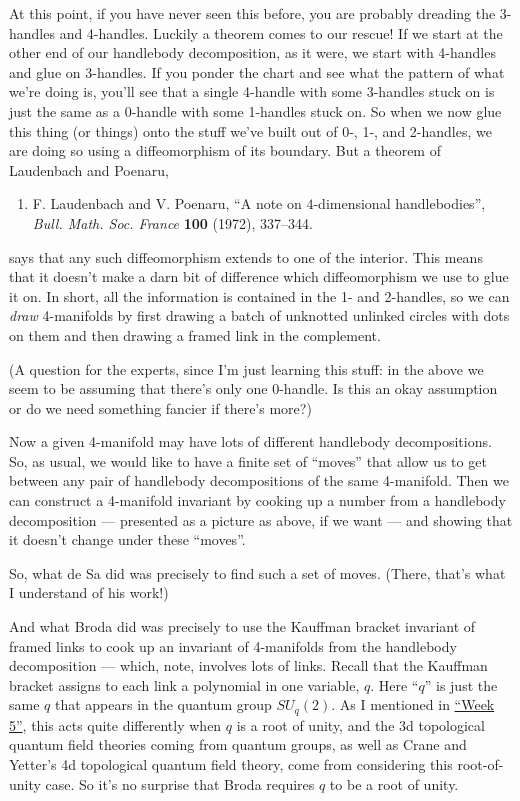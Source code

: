 \documentclass{article}
\begin{document}
At this point, if you have never seen this before, you are probably
dreading the 3-handles and 4-handles. Luckily a theorem comes to our
rescue! If we start at the other end of our handlebody decomposition, as
it were, we start with 4-handles and glue on 3-handles. If you ponder
the chart and see what the pattern of what we're doing is, you'll see
that a single 4-handle with some 3-handles stuck on is just the same as
a 0-handle with some 1-handles stuck on. So when we now glue this thing
(or things) onto the stuff we've built out of 0-, 1-, and 2-handles, we
are doing so using a diffeomorphism of its boundary. But a theorem of
Laudenbach and Poenaru,

\begin{enumerate}
\def\labelenumi{\arabic{enumi})}
\setcounter{enumi}{4}
\item 
F. Laudenbach and V. Poenaru, 
``A note on \(4\)-dimensional handlebodies'', \emph{Bull. Math. Soc. France} \textbf{100} (1972),
337--344.
\end{enumerate}
\noindent
says that any such diffeomorphism extends to one of the interior. This
means that it doesn't make a darn bit of difference which diffeomorphism
we use to glue it on. In short, all the information is contained in the
1- and 2-handles, so we can \emph{draw} 4-manifolds by first drawing a
batch of unknotted unlinked circles with dots on them and then drawing a
framed link in the complement.

(A question for the experts, since I'm just learning this stuff: in
the above we seem to be assuming that there's only one 0-handle. Is this
an okay assumption or do we need something fancier if there's more?)

Now a given 4-manifold may have lots of different handlebody
decompositions. So, as usual, we would like to have a finite set of
``moves'' that allow us to get between any pair of handlebody
decompositions of the same 4-manifold. Then we can construct a
4-manifold invariant by cooking up a number from a handlebody
decomposition --- presented as a picture as above, if we want --- and
showing that it doesn't change under these ``moves''.

So, what de Sa did was precisely to find such a set of moves. (There,
that's what I understand of his work!)

And what Broda did was precisely to use the Kauffman bracket invariant
of framed links to cook up an invariant of 4-manifolds from the
handlebody decomposition --- which, note, involves lots of links. Recall
that the Kauffman bracket assigns to each link a polynomial in one
variable, \(q\). Here ``\(q\)'' is just the same \(q\) that appears in
the quantum group \(SU_q(2)\). As I mentioned in
\protect\hyperlink{week5}{``Week 5''}, this acts quite differently when
\(q\) is a root of unity, and the 3d topological quantum field theories
coming from quantum groups, as well as Crane and Yetter's 4d topological
quantum field theory, come from considering this root-of-unity case. So
it's no surprise that Broda requires \(q\) to be a root of unity.
\end{document}
